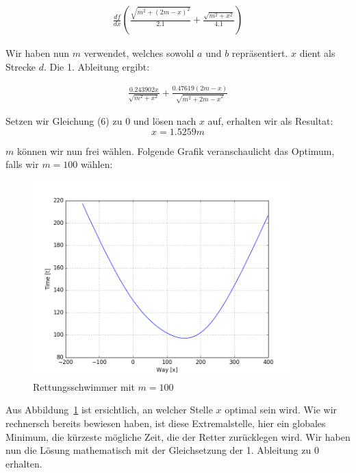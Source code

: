 \documentclass[10pt]{article}         %
\begin{document}
\begin{align}
    \frac{df}{dx}(\frac{\sqrt{m^2+{(2m-x)}^2}}{2.1} + \frac{\sqrt{m^2+x^2}}{4.1})
\end{align}

Wir haben nun $m$ verwendet, welches sowohl $a$ und $b$ repräsentiert. $x$ dient als Strecke $d$. Die 1. Ableitung ergibt:

\begin{align}
    \frac{0.243902x}{\sqrt{m^2+x^2}}+\frac{0.47619(2m-x)}{\sqrt{m^2+{2m-x}^2}}
\end{align}

Setzen wir Gleichung (6) zu 0 und lösen nach $x$ auf, erhalten wir als Resultat:
\[
    x = 1.5259m
\]

$m$ können wir nun frei wählen. Folgende Grafik veranschaulicht das Optimum, falls wir $m=100$ wählen:

\pagebreak
\begin{figure}[!ht]
    \centering
    \includegraphics[width=0.9\textwidth]{lifeguard_100}
    \caption{Rettungsschwimmer mit $m=100$}\label{lifeguard_100}
\end{figure}

Aus Abbildung~\ref{lifeguard_100} ist ersichtlich, an welcher Stelle $x$ optimal sein wird. Wie wir rechnersch bereits bewiesen haben, ist diese Extremalstelle, hier ein globales Minimum, die kürzeste mögliche Zeit, die der Retter zurücklegen wird. Wir haben nun die Lösung mathematisch mit der Gleichsetzung der 1. Ableitung zu 0 erhalten. 
\end{document}
